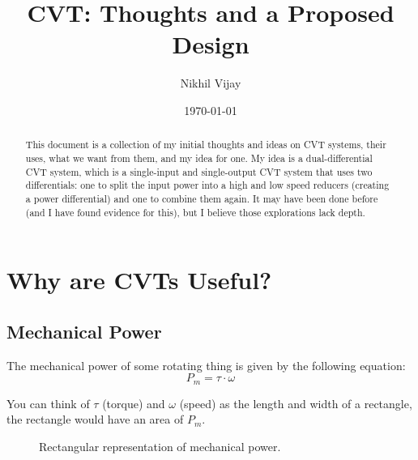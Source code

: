 \documentclass[12pt]{article}
\begin{document}

\usetikzlibrary{calc, patterns, patterns.meta}

\title{CVT: Thoughts and a Proposed Design}
\author{Nikhil Vijay}
\date{\today}
\maketitle

\begin{abstract}
  This document is a collection of my initial thoughts and ideas on CVT systems, their uses, what we want from them, and my idea for one. My idea is a dual-differential CVT system, which is a single-input and single-output CVT system that uses two differentials: one to split the input power into a high and low speed reducers (creating a power differential) and one to combine them again. It may have been done before (and I have found evidence for this), but I believe those explorations lack depth.
\end{abstract}

\section{Why are CVTs Useful?}
\subsection{Mechanical Power}
The mechanical power of some rotating thing is given by the following equation:
\begin{equation}
  P_{m} = \tau\cdot\omega
\end{equation}

You can think of $\tau$ (torque) and $\omega$ (speed) as the length and width of a rectangle, the rectangle would have an area of $P_{m}$. 

\begin{figure}[H]
  \centering
  \caption{Rectangular representation of mechanical power.}\label{fig:power_rectangle}
\end{figure}
\end{document}
